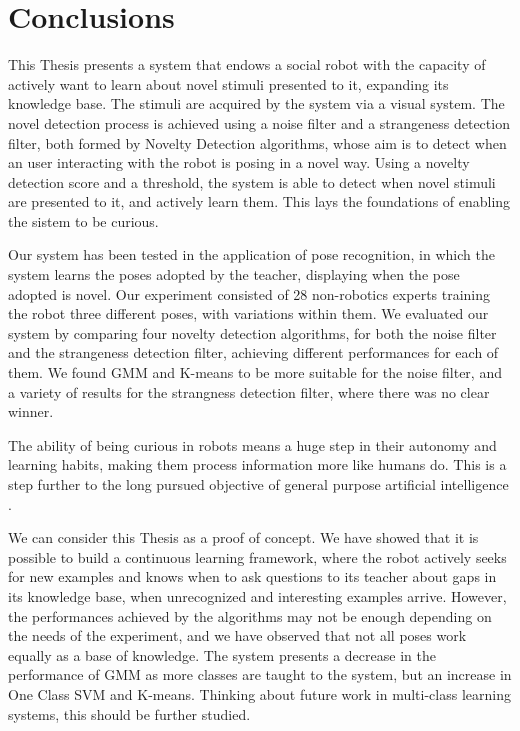 
\chapter{Conclusions} %

\label{Chapter6} %


This Thesis presents a system that endows a social robot with the capacity of actively want to learn about novel stimuli presented to it, expanding its knowledge base. The stimuli are acquired by the system via a visual system. The novel detection process is achieved using a noise filter and a strangeness detection filter, both formed by Novelty Detection algorithms, whose aim is to detect when an user interacting with the robot is posing in a novel way. Using a novelty detection score and a threshold, the system is able to detect when novel stimuli are presented to it, and actively learn them. This lays the foundations of enabling the sistem to be curious.

Our system has been tested in the application of pose recognition, in which the system learns the poses adopted by the teacher, displaying when the pose adopted is novel. Our experiment consisted of 28 non-robotics experts training the robot three different poses, with variations within them. We evaluated our system by comparing four novelty detection algorithms, for both the noise filter and the strangeness detection filter, achieving different performances for each of them. We found GMM and K-means to be more suitable for the noise filter, and a variety of results for the strangness detection filter, where there was no clear winner. 

The ability of being curious in robots means a huge step in their autonomy and learning habits, making them process information more like humans do. This is a step further to the long pursued objective of general purpose artificial intelligence \cite{Brooks1990}.

We can consider this Thesis as a proof of concept. We have showed that it is possible to build a continuous learning framework, where the robot actively seeks for new examples and knows when to ask questions to its teacher about gaps in its knowledge base, when unrecognized and interesting examples arrive. However, the performances achieved by the algorithms may not be enough depending on the needs of the experiment, and we have observed that not all poses work equally as a base of knowledge. The system presents a decrease in the performance of GMM as more classes are taught to the system, but an increase in One Class SVM and K-means. Thinking about future work in multi-class learning systems, this should be further studied. 

